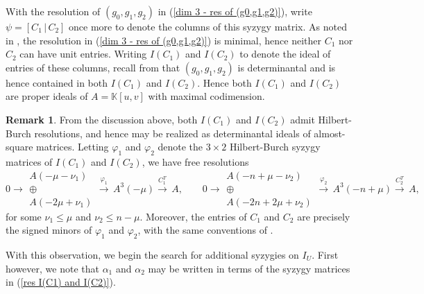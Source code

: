 \documentclass[reqno]{amsart}
\numberwithin{equation}{section}
\theoremstyle{definition}
\newtheorem{rem}[thm]{Remark}
\def\K{\mathbb{K}}
\begin{document}
With the resolution of $(g_0,g_1,g_2)$ in (\ref{dim 3 - res of (g0,g1,g2)}), write $\psi = [C_1\,|\,C_2]$ once more to denote the  columns of this syzygy matrix. As noted in , the resolution in (\ref{dim 3 - res of (g0,g1,g2)}) is minimal, hence neither $C_1$ nor $C_2$ can have unit entries. Writing $I(C_1)$ and $I(C_2)$ to denote the ideal of entries of these columns, recall from  that $(g_0,g_1,g_2)$ is determinantal and is hence contained in both $I(C_1)$ and $I(C_2)$. Hence both $I(C_1)$ and $I(C_2)$ are proper ideals of $A=\K[u,v]$ with maximal codimension.

\begin{rem}\label{I(C1) and I(C2) HB resolutions}
 From the discussion above, both $I(C_1)$ and $I(C_2)$ admit Hilbert-Burch resolutions, and hence may be realized as determinantal ideals of almost-square matrices. Letting $\varphi_1$ and $\varphi_2$ denote the $3\times 2$ Hilbert-Burch syzygy matrices of $I(C_1)$ and $I(C_2)$, we have free resolutions 
 \begin{equation}\label{res I(C1) and I(C2)}
 0 \longrightarrow \begin{array}{c}
 A(-\mu-\nu_1)\\
 \oplus \\
A(-2\mu+\nu_1)
\end{array} \overset{\varphi_1}{\longrightarrow} \,
A^3(-\mu)\overset{C_1^T}{\longrightarrow} \,
A,\quad\quad 
0 \longrightarrow \begin{array}{c}
 A(-n+\mu-\nu_2)\\
 \oplus \\
A(-2n+2\mu+\nu_2)
\end{array} \overset{\varphi_2}{\longrightarrow} \,
A^3(-n+\mu)\overset{C_2^T}{\longrightarrow} \,
A, 
\end{equation}
for some $\nu_1\leq \mu$ and $\nu_2\leq n-\mu$. Moreover, the entries of $C_1$ and $C_2$ are precisely the signed minors of $\varphi_1$ and $\varphi_2$, with the same conventions of . 
\end{rem}






With this observation, we begin the search for additional syzygies on $I_U$. First however, we note that $\alpha_1$ and $\alpha_2$ may be written in terms of the syzygy matrices in (\ref{res I(C1) and I(C2)}).
\end{document}
